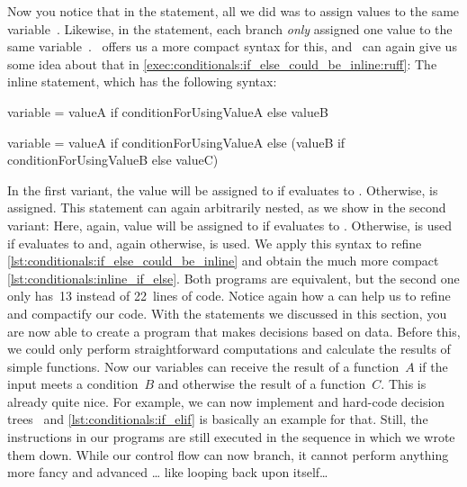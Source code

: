 Now you notice that in the  statement, all we did was to assign values to the same variable~.
Likewise, in the  statement, each branch \emph{only} assigned one value to the same variable~.
\python\ offers us a more compact syntax for this, and \ruff\ can again give us some idea about that in \cref{exec:conditionals:if_else_could_be_inline:ruff}:
The inline  statement, which has the following syntax:%
%
\begin{pythonSyntax}[false]
variable = valueA if conditionForUsingValueA else valueB

variable = valueA if conditionForUsingValueA else (valueB if conditionForUsingValueB else valueC)
\end{pythonSyntax}
%
In the first variant, the value  will be assigned to  if  evaluates to .
Otherwise,  is assigned.
This statement can again arbitrarily nested, as we show in the second variant:
Here, again, value  will be assigned to  if  evaluates to .
Otherwise,  is used if  evaluates to  and, again otherwise,  is used.%
%
%
%
We apply this syntax to refine \cref{lst:conditionals:if_else_could_be_inline} and obtain the much more compact \cref{lst:conditionals:inline_if_else}.
Both programs are equivalent, but the second one only has~13 instead of 22~lines of code.
Notice again how a  can help us to refine and compactify our code.%
%
\endhsection%
%
%
With the statements we discussed in this section, you are now able to create a program that makes decisions based on data.
Before this, we could only perform straightforward computations and calculate the results of simple functions.
Now our variables can receive the result of a function~$A$ if the input meets a condition~$B$ and otherwise the result of a function~$C$.
This is already quite nice.
For example, we can now implement and hard-code decision trees~\cite{RN2022AIAMA,SSBD2014UMLFTTA} and \cref{lst:conditionals:if_elif} is basically an example for that.
Still, the instructions in our programs are still executed in the sequence in which we wrote them down.
While our control flow can now branch, it cannot perform anything more fancy and advanced {\dots} like looping back upon itself\dots%
\endhsection%
%
\FloatBarrier%
\endhsection%
%
